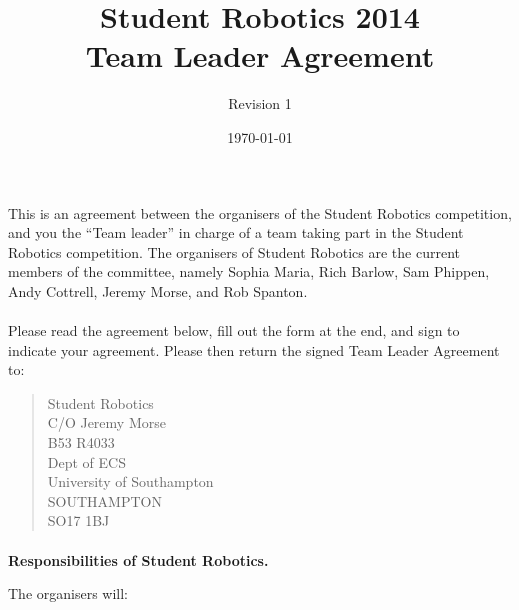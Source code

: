 \documentclass[a4paper, 11pt]{scrartcl}
\title {Student Robotics 2014\\ Team Leader Agreement}
\author{Revision 1}
\date{\today}
\begin{document}
\maketitle

This is an agreement between the organisers of the Student Robotics
competition, and you the ``Team leader'' in charge of a team taking part
in the Student Robotics competition. The organisers of Student Robotics are
the current members of the committee, namely Sophia Maria, Rich Barlow,
Sam Phippen, Andy Cottrell, Jeremy Morse, and Rob Spanton.

\paragraph{}

Please read the agreement below, fill out the form at the end, and sign to
indicate your agreement. Please then return the signed Team Leader Agreement to:
\begin{quote}
	Student Robotics \\
	C/O Jeremy Morse \\
	B53 R4033 \\
	Dept of ECS \\
	University of Southampton \\
	SOUTHAMPTON \\
	SO17 1BJ
\end{quote}

\paragraph{}

\textbf{Responsibilities of Student Robotics.}

The organisers will:
\end{document}
